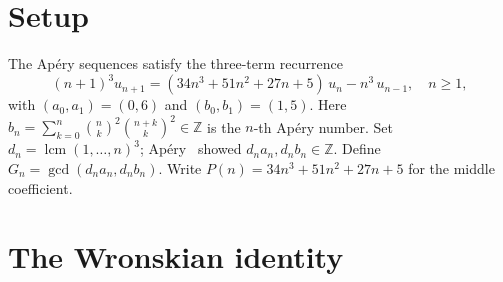 \documentclass[11pt]{article}
\theoremstyle{definition}
\theoremstyle{remark}
\begin{document}
\begin{abstract}
coefficient zeros remains conjectural.
The Poisson tail predicts
$\max_{p \le N} Z(p) \sim 2\log\log N$,
so $Z(p)$ is almost certainly unbounded.
Under the weaker Ces\`aro hypothesis
$\sum_{p \le x} Z(p) \ll \pi(x)$
(Hypothesis~$\bar{Z}$),
which the Poisson model supports, we prove
$\log G_n = O(\sqrt{n})$
for density~$1$, matching the unconditional
small-prime floor, with the conditional
exceptional set shrinking to $O(N^{1/3})$
and having upper Banach density zero.
The proof combines a dyadic
divisor-incidence bound with a sub-interval
zero-count argument to reduce the
leading-digit bottleneck from
$O(N^{3/2})$ to $O(N^{10/7}/\log N)$
unconditionally, and to $O(N^{4/3}/\log N)$
under Hypothesis~$\bar{Z}$.
A prime-wise decomposition of the
residual $L^2$-norm
$\|\eta\|^2 = D + O$ (diagonal~$+$~off-diagonal)
shows, under the natural second-mass condition
$\sum_{N<p\le2N}Z(p)^2=O(N/\log N)$, that
$D = T + O(1/\ln N)$.  The all-$n$ conjecture
would then follow from the sufficient two-prime dispersion input
$O=o(T)$.
Computation through $N = 262{,}144$ confirms
$|O/T| < 2 \times 10^{-3}$.
Two structural reductions further localize the gap:
prime counting alone disposes of every prime
$p \le n/(f(n)\log n)$ for any $f \to \infty$,
so only the quotient classes
$\lfloor n/p \rfloor < f(n)\log n$ matter;
and a single fixed factorial moment
$(\mathrm{HM})_k$ with $k > 6$---at the independence
scale, compatible with $Z(p) \ll p^{2/3}$, and proved
here unconditionally for $k = 2$---would give the
full conjecture with the power saving
$\log G_n \ll n^{2/3 + 2/k + o(1)}$.
\end{abstract}

\section{Setup}

The Ap\'ery sequences satisfy the three-term recurrence
\begin{equation}\label{eq:rec}
(n+1)^3 u_{n+1} = (34n^3 + 51n^2 + 27n + 5)\,u_n - n^3\,u_{n-1},
\quad n \ge 1,
\end{equation}
with $(a_0, a_1) = (0, 6)$ and $(b_0, b_1) = (1, 5)$.
Here $b_n = \sum_{k=0}^n \binom{n}{k}^2 \binom{n+k}{k}^2 \in \mathbb{Z}$
is the $n$-th Ap\'ery number.
Set $d_n = \operatorname{lcm}(1,\ldots,n)^3$;
Ap\'ery~\cite{Apery1979} showed $d_n a_n, d_n b_n \in \mathbb{Z}$.
Define $G_n = \gcd(d_n a_n, d_n b_n)$.
Write $P(n) = 34n^3 + 51n^2 + 27n + 5$ for the middle coefficient.

\section{The Wronskian identity}
\end{document}

